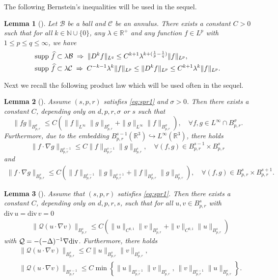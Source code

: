 \documentclass[12pt]{article}
\newtheorem{lemma}{Lemma}[section]
\newcommand{\na}{\nabla}
\newcommand{\R}{\mathbb{R}}
\newcommand{\f}{\left}
\newcommand{\g}{\right}
\begin{document}
The following Bernstein's inequalities will be used in the sequel.
\begin{lemma}[\cite{B}] \label{lem2.1} Let $\mathcal{B}$ be a ball and $\mathcal{C}$ be an annulus. There exists a constant $C>0$ such that for all $k\in \mathbb{N}\cup \{0\}$, any $\lambda\in \R^+$ and any function $f\in L^p$ with $1\leq p \leq q \leq \infty$, we have
\begin{align*}
&{\rm{supp}}\ \widehat{f}\subset \lambda \mathcal{B}\;\Rightarrow\; \|D^kf\|_{L^q}\leq C^{k+1}\lambda^{k+(\frac{1}{p}-\frac{1}{q})}\|f\|_{L^p},  \\
&{\rm{supp}}\ \widehat{f}\subset \lambda \mathcal{C}\;\Rightarrow\; C^{-k-1}\lambda^k\|f\|_{L^p} \leq \|D^kf\|_{L^p} \leq C^{k+1}\lambda^k\|f\|_{L^p}.
\end{align*}
\end{lemma}
Next we recall the following product law which will be used often in the sequel.
\begin{lemma}[\cite{B}]\label{lp}
Assume $(s,p,r)$ satisfies \eqref{eq:spr1} and $\sigma>0$. Then
 there exists a constant $C$, depending only on $d,p,r,\sigma$ or $s$ such that
$$\|fg\|_{B^{\sigma}_{p,r}}\leq C\f(\|f\|_{L^\infty}\|g\|_{B^\sigma_{p,r}}+\|g\|_{L^\infty}\|f\|_{B^{\sigma}_{p,r}}\g),\quad \forall f,g\in L^\infty\cap B^{\sigma}_{p,r}.$$
Furthermore, due to the embedding $B^{s-1}_{p,r}(\R^3)\hookrightarrow L^{\infty}(\R^3)$, there holds
$$\|f\cdot \na g\|_{B^{s-1}_{p,r}}\leq C\|f\|_{B^{s-1}_{p,r}}\|g\|_{B^s_{p,r}},\quad \forall(f,g)\in B^{s-1}_{p,r}\times B^s_{p,r}$$
and
\begin{align}\label{cj}
\|f\cdot \na g\|_{B^{s}_{p,r}}\leq C\f(\|f\|_{B^{s-1}_{p,r}}\|g\|_{B^{s+1}_{p,r}}+\|f\|_{B^{s}_{p,r}}\|g\|_{B^{s}_{p,r}}\g),\quad \forall(f,g)\in B^{s}_{p,r}\times B^{s+1}_{p,r}.
\end{align}
\end{lemma}

\begin{lemma}[\cite{GLY}]\label{lem:P}
Assume that $(s,p,r)$ satisfies \eqref{eq:spr1}. Then there exists a constant $C$, depending only on $d,p,r,s$, such that for all $u,v\in B^s_{p,r}$ with $\mathrm{div\,} u=\mathrm{div\,} v=0$
\begin{align*}
&\|\mathcal{Q}(u\cdot \na v)\|_{B^s_{p,r}}\leq C \f(\|u\|_{C^{0,1}}\|v\|_{B^s_{p,r}}+\|v\|_{C^{0,1}}\|u\|_{B^s_{p,r}}\g)
\end{align*}
with $\mathcal{Q}= -(-\Delta)^{-1}\nabla {\rm{div}}$. Furthermore, there holds
\begin{align*}
&\|\mathcal{Q}(u\cdot \na v)\|_{B^s_{p,r}}\leq C \|u\|_{B^s_{p,r}}\|v\|_{B^s_{p,r}},\\
&\|\mathcal{Q}(u\cdot \na v)\|_{B^{s-1}_{p,r}}\leq C \min\f\{\|u\|_{B^{s-1}_{p,r}}\|v\|_{B^s_{p,r}},\, \|v\|_{B^{s-1}_{p,r}}\|u\|_{B^s_{p,r}}\g\}.
\end{align*}
\end{lemma}
\end{document}
